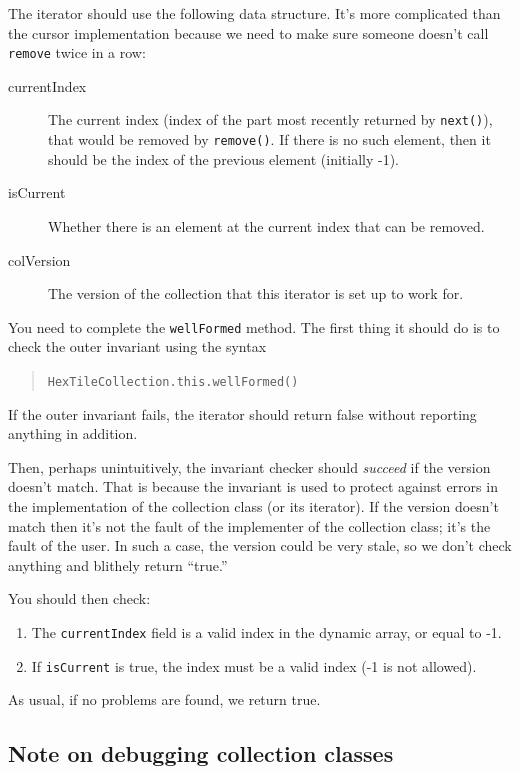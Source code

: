 \documentclass[11pt]{article}
\begin{document}
The iterator should use the following data structure.
It's more complicated than the cursor implementation because we need
to make sure someone doesn't call \texttt{remove} twice in a row:
\begin{description}
  \item[currentIndex] The current index (index of the part most
    recently returned by \texttt{next()}), that would be removed by
    \texttt{remove()}.   If there is no such element, then it should be
    the index of the previous element (initially -1).
  \item[isCurrent] Whether there is an element at the current index
    that can be removed.
  \item[colVersion] The version of the collection that this iterator is
    set up to work for.
\end{description}
You need to complete the \texttt{wellFormed} method.  The first thing
it should do is to check the outer invariant using the syntax
\begin{quote}
  \texttt{HexTileCollection.this.wellFormed()}
\end{quote}
If the outer invariant fails, the iterator should return false without
reporting anything in addition.

Then, perhaps unintuitively, the invariant checker should
\emph{succeed} if the 
version doesn't match.  That is because the invariant is used to
protect against errors in the implementation of the collection class
(or its iterator).  If the version doesn't match then it's not the
fault of the implementer of the collection class; it's the fault of
the user.  In such a case, the version could be very stale, so we
don't check anything and blithely return ``true.''

You should then check:
\begin{enumerate}
  \item The \texttt{currentIndex} field is a valid index in the dynamic array,
    or equal to -1.
  \item If \texttt{isCurrent} is true, the index must be a valid
    index (-1 is not allowed).
\end{enumerate}
As usual, if no problems are found, we return true.

\subsection{Note on debugging collection classes}
\end{document}
